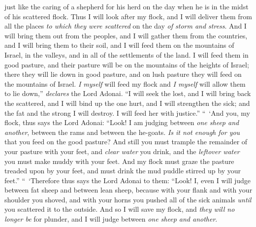 \begin{biblechapter}
\verse just like the caring of a shepherd for his herd on the day when he is in the midst of his scattered flock. Thus I will look after my flock, and I will deliver them from all the places \textit{to which they were scattered} on the day \textit{of storm and stress}.
\verse And I will bring them out from the peoples, and I will gather them from the countries, and I will bring them to their soil, and I will feed them on the mountains of Israel, in the valleys, and in all of the settlements of the land.
\verse I will feed them in good pasture, and their pasture will be on the mountains of the heights of Israel; there they will lie down in good pasture, and on lush pasture they will feed on the mountains of Israel.
\verse \textit{I myself} will feed my flock and \textit{I myself} will allow them to lie down,” \textit{declares} the Lord Adonai.
\verse “I will seek the lost, and I will bring back the scattered, and I will bind up the one hurt, and I will strengthen the sick; and the fat and the strong I will destroy. I will feed her with justice.”
\verse “ ‘And you, my flock, thus says the Lord Adonai: “Look! I am judging between \textit{one sheep and another}, between the rams and between the he-goats.
\verse \textit{Is it not enough for you} that you feed on the good pasture? And still you must trample the remainder of your pasture with your feet, and \textit{clear water} you drink, and the \textit{leftover water} you must make muddy with your feet.
\verse And my flock must graze the pasture treaded upon by your feet, and must drink the mud puddle stirred up by your feet.”
\verse “ ‘Therefore thus says the Lord Adonai to them: “Look! I, even I will judge between fat sheep and between lean sheep,
\verse because with your flank and with your shoulder you shoved, and with your horns you pushed all of the sick animals \textit{until} you scattered it to the outside.
\verse And so I will save my flock, and \textit{they will no longer be} for plunder, and I will judge between \textit{one sheep and another}.

\end{biblechapter}
